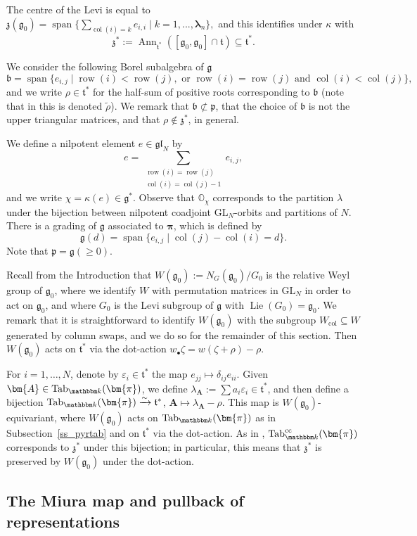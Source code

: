 \documentclass[twoside,12pt,reqno]{amsart}
\theoremstyle{remark}
\numberwithin{equation}{section}
\def\k{{\mathbbm k}}
\newcommand{\Tab}{\operatorname{Tab}}
\def\Lie{\operatorname{Lie}}
\def\cc{{\operatorname{cc}}}
\def\Ann{\operatorname{Ann}}
\def\col{\operatorname{col}}
\def\sspan{\operatorname{span}}
\def\col{\operatorname{col}}
\def\row{\operatorname{row}}
\def\bA{{\bm{A}}}
\def\blambda{{\bm{\lambda}}}
\def\bpi{{\bm{\pi}}}
\def\O{{\mathbb O}}
\def\GL{\mathrm{GL}}
\def\b{\mathfrak b}
\def\g{{\mathfrak g}}
\def\gl{\mathfrak{gl}}
\def\p{\mathfrak p}
\def\t{\mathfrak t}
\def\z{\mathfrak{z}}
\def\b{\mathfrak{b}}
\begin{document}
The centre of the Levi is equal to
$\z(\g_0) = \sspan\{ \sum_{\col(i) = k} e_{i,i} \mid k=1,...,\blambda_n\},$
and this identifies under $\kappa$ with
$$\z^* := \Ann_{\t^*} ([\g_0, \g_0]\cap \t) \subseteq \t^*.$$

We consider the following Borel subalgebra of $\g$
$$\b = \sspan\{e_{i,j} \mid \row(i) < \row(j), \text{ or } \row(i) = \row(j) \text{ and } \col(i) < \col(j)\},$$
and we write $\rho \in \t^*$ for the half-sum of positive roots corresponding to $\b$ (note that in \cite{GT} this is denoted $\widetilde{\rho}$). We remark that $\b \not\subset \p$, that the choice of $\b$ is not the upper triangular matrices, and that $\rho\notin \z^*$, in general.


We define a nilpotent element $e\in \gl_N$ by
$$e = \sum_{\substack{\row(i) = \row(j)\\ \col(i) = \col(j)-1}} e_{i,j},$$
and we write $\chi =\kappa(e) \in \g^*$. Observe that $\O_\chi$ corresponds to the partition $\lambda$ under the bijection between nilpotent coadjoint $\GL_N$-orbits and partitions of $N$. There is a grading of $\g$ associated to $\bpi$, which is defined by
$$\g(d) = \sspan\{e_{i,j} \mid \col(j) - \col(i) = d\}.$$
Note that $\p = \g(\ge 0)$.

Recall from the Introduction that $W(\g_0):=N_G(\g_0)/G_0$ is the relative Weyl group of $\g_0$, where we identify $W$ with permutation matrices in $\GL_N$ in order to act on $\g_0$, and where $G_0$ is the Levi subgroup of $\g$ with $\Lie(G_0)=\g_0$. We remark that it is straightforward to identify $W(\g_0)$ with the subgroup $W_{\col}\subseteq W$ generated by column swaps, and we do so for the remainder of this section. Then $W(\g_0)$ acts on $\t^*$ via the dot-action $w_\bullet \zeta = w(\zeta + \rho) - \rho$. 

For $i=1,\ldots,N$, denote by $\varepsilon_i\in\t^*$ the map $e_{jj}\mapsto \delta_{ij}e_{ii}$.
Given $\bA \in \Tab_\k(\bpi)$, we define $\lambda_\bA := \sum{a_i}\varepsilon_i \in \t^*$, and then define a bijection $\Tab_\k(\bpi)\xrightarrow{\sim}\t^*$, $\bA \mapsto \lambda_\bA-\rho$. This map is $W(\g_0)$-equivariant, where $W(\g_0)$ acts on $\Tab_\k(\bpi)$ as in Subsection~\ref{ss_pyrtab} and on $\t^*$ via the dot-action. As in \cite[]{GT}, $\Tab_\k^{\cc}(\bpi)$ corresponds to $\z^*$ under this bijection; in particular, this means that $\z^*$ is preserved by $W(\g_0)$ under the dot-action. 




\subsection{The Miura map and pullback of representations}
\end{document}
